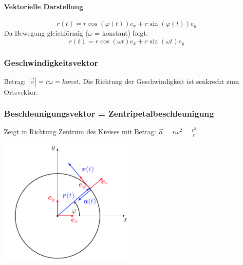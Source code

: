 \documentclass[7pt]{article}
\begin{document}
\begin{multicols*}{3}
\paragraph{Vektorielle Darstellung}
\begin{equation*}
	r(t) = r \cos(\varphi(t))e_x + r \sin(\varphi(t))e_y
\end{equation*}
Da Bewegung gleichf{\"o}rmig ($\omega$ = konstant) folgt:
\begin{equation*}
	r(t) = r \cos(\omega t)e_x + r \sin(\omega t)e_y
\end{equation*}


\subsubsection{Geschwindigkeitsvektor}
Betrag: $|\vec{v}| = r \omega = konst.$ \newline
Die Richtung der Geschwindigkeit ist senkrecht zum Ortsvektor.

\subsubsection{Beschleunigungsvektor = Zentripetalbeschleunigung}
Zeigt in Richtung Zentrum des Kreises mit Betrag: $\vec{a} = r \omega ^2 = \frac{v^2}{r}$

\begin{center}
	\includegraphics[width=200pt]{images/beschleunigung_radial}
\end{center}



\end{multicols*}
\end{document}
